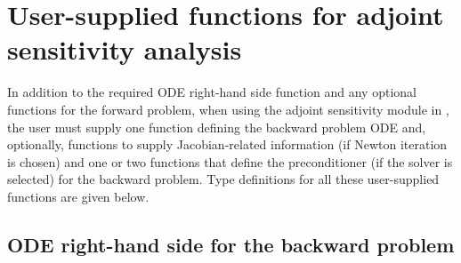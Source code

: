 \section{User-supplied functions for adjoint sensitivity analysis}
\label{ss:user_fct_adj}

In addition to the required ODE right-hand side function and any optional functions
for the forward problem, when using the adjoint sensitivity module in {\cvodes},
the user must supply one function defining the backward problem ODE and, optionally,
functions to supply Jacobian-related information (if Newton iteration is chosen) and
one or two functions that define the preconditioner (if the {\cvspgmr} solver is
selected) for the backward problem.
Type definitions for all these user-supplied functions are given below.

\subsection{ODE right-hand side for the backward problem}


